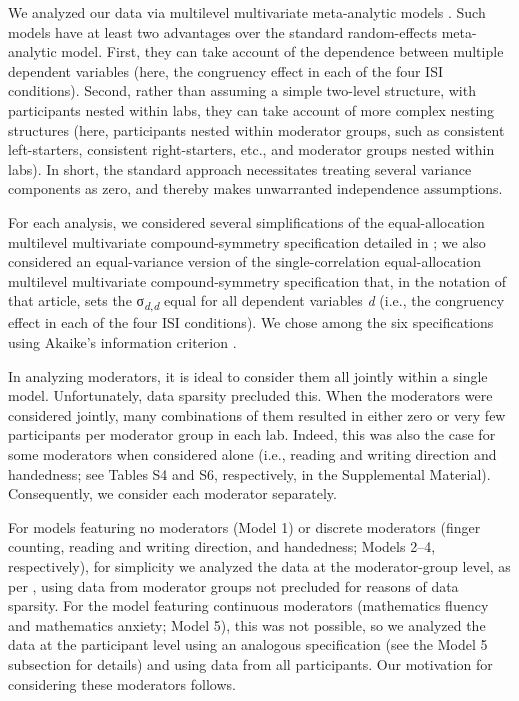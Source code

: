 \documentclass[man,floatsintext]{apa6}
\theoremstyle{definition}
\theoremstyle{definition}
\theoremstyle{definition}
\theoremstyle{remark}
\begin{document}
We analyzed our data via multilevel multivariate meta-analytic models
\autocite{McSBoc18}. Such models have at least two advantages over the
standard random-effects meta-analytic model. First, they can take
account of the dependence between multiple dependent variables (here,
the congruency effect in each of the four ISI conditions). Second,
rather than assuming a simple two-level structure, with participants
nested within labs, they can take account of more complex nesting
structures (here, participants nested within moderator groups, such as
consistent left-starters, consistent right-starters, etc., and moderator
groups nested within labs). In short, the standard approach necessitates
treating several variance components as zero, and thereby makes
unwarranted independence assumptions.

For each analysis, we considered several simplifications of the
equal-allocation multilevel multivariate compound-symmetry specification
detailed in \textcite{McSBoc18}; we also considered an equal-variance
version of the single-correlation equal-allocation multilevel
multivariate compound-symmetry specification that, in the notation of
that article, sets the σ\textsubscript{\emph{d},\emph{d}} equal for all
dependent variables \emph{d} (i.e., the congruency effect in each of the
four ISI conditions). We chose among the six specifications using
Akaike's information criterion \autocite[AIC;][]{Aki74}.

In analyzing moderators, it is ideal to consider them all jointly within
a single model. Unfortunately, data sparsity precluded this. When the
moderators were considered jointly, many combinations of them resulted
in either zero or very few participants per moderator group in each lab.
Indeed, this was also the case for some moderators when considered alone
(i.e., reading and writing direction and handedness; see Tables S4 and
S6, respectively, in the Supplemental Material). Consequently, we
consider each moderator separately.

For models featuring no moderators (Model 1) or discrete moderators
(finger counting, reading and writing direction, and handedness; Models
2--4, respectively), for simplicity we analyzed the data at the
moderator-group level, as per \textcite{McSBoc18}, using data from
moderator groups not precluded for reasons of data sparsity. For the
model featuring continuous moderators (mathematics fluency and
mathematics anxiety; Model 5), this was not possible, so we analyzed the
data at the participant level using an analogous specification (see the
Model 5 subsection for details) and using data from all participants.
Our motivation for considering these moderators follows.
\end{document}
